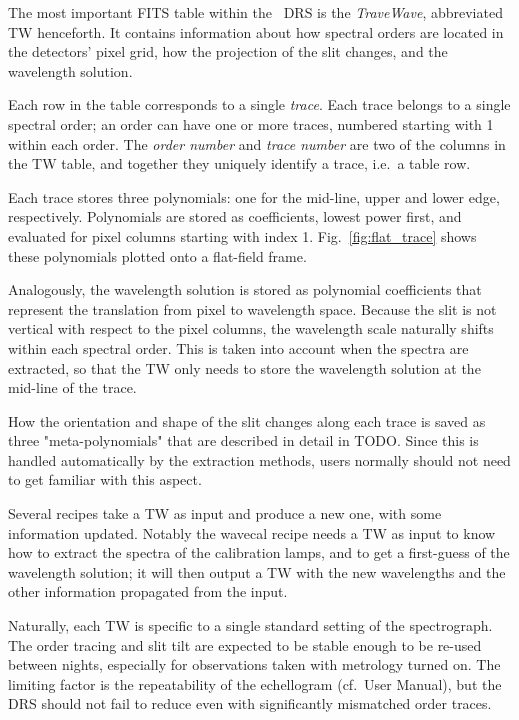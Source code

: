 The most important FITS table within the \instrument\ DRS is the
\emph{TraveWave}, abbreviated TW henceforth. It contains information about how
spectral orders are located in the detectors' pixel grid, how the projection of
the slit changes, and the wavelength solution.

Each row in the table corresponds to a single \emph{trace}. Each trace belongs
to a single spectral order; an order can have one or more traces, numbered
starting with 1 within each order. The \emph{order number} and \emph{trace
number} are two of the columns in the TW table, and together they uniquely
identify a trace, i.e.~a table row.

Each trace stores three polynomials: one for the mid-line, upper and lower edge,
respectively. Polynomials are stored as coefficients, lowest power first, and
evaluated for pixel columns starting with index 1. Fig.~\ref{fig:flat_trace}
shows these polynomials plotted onto a flat-field frame.

Analogously, the wavelength solution is stored as polynomial coefficients
that represent the translation from pixel to wavelength space. Because the slit
is not vertical with respect to the pixel columns, the wavelength scale
naturally shifts within each spectral order. This is taken into account when the
spectra are extracted, so that the TW only needs to store the wavelength
solution at the mid-line of the trace.

How the orientation and shape of the slit changes along each trace is saved as
three "meta-polynomials" that are described in detail in TODO. Since this is
handled automatically by the extraction methods, users normally should not need
to get familiar with this aspect.

Several recipes take a TW as input and produce a new one, with some information
updated. Notably the wavecal recipe needs a TW as input to know how to extract
the spectra of the calibration lamps, and to get a first-guess of the
wavelength solution; it will then output a TW with the new wavelengths and
the other information propagated from the input.

Naturally, each TW is specific to a single standard setting of the spectrograph.
The order tracing and slit tilt are expected to be stable enough to be re-used
between nights, especially for observations taken with metrology turned on. The
limiting factor is the repeatability of the echellogram (cf.~User Manual), but
the DRS should not fail to reduce even with significantly mismatched order
traces.

